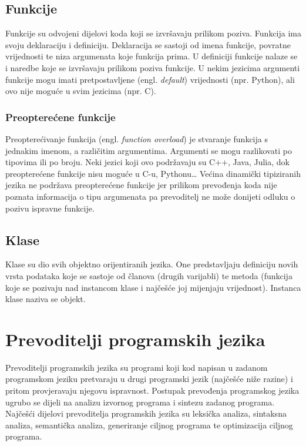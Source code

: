 \documentclass[times, utf8, zavrsni]{fer}
\begin{document}
\section{Funkcije}
Funkcije su odvojeni dijelovi koda koji se izvršavaju prilikom poziva. Funkcija ima svoju deklaraciju i definiciju. Deklaracija se sastoji od imena funkcije, povratne vrijednosti 
te niza argumenata koje funkcija prima. U definiciji funkcije nalaze se i naredbe koje se izvršavaju prilikom poziva funkcije. U nekim jezicima argumenti funkcije mogu imati 
pretpostavljene (engl. \textit{default}) vrijednosti (npr. Python), ali ovo nije moguće u svim jezicima (npr. C).

\subsection{Preopterećene funkcije}
Preopterećivanje funkcija (engl. \textit{function overload}) je stvaranje funkcija s jednakim imenom, a različitim argumentima. Argumenti se mogu razlikovati po tipovima
ili po broju. Neki jezici koji ovo podržavaju su C++, Java, Julia, dok preopterećene funkcije nisu moguće u C-u, Pythonu\dots \citep{Kahanwal2014ComparativeSO} Većina dinamički tipiziranih jezika ne podržava
preopterećene funkcije jer prilikom prevođenja koda nije poznata informacija o tipu argumenata pa prevoditelj ne može donijeti odluku o pozivu ispravne funkcije.

\section{Klase}
Klase su dio svih objektno orijentiranih jezika. One predstavljaju definiciju novih vrsta podataka koje se sastoje od članova (drugih varijabli) te metoda (funkcija koje se pozivaju
nad instancom klase i najčešće joj mijenjaju vrijednost). Instanca klase naziva se objekt.

\chapter{Prevoditelji programskih jezika}
Prevoditelji programskih jezika su programi koji kod napisan u zadanom programskom jeziku pretvaraju u drugi programski jezik (najčešće niže razine) i pritom provjeravaju njegovu ispravnost.
Postupak prevođenja programskog jezika ugrubo se dijeli na analizu izvornog programa i sintezu zadanog programa. Najčešći dijelovi prevoditelja programskih jezika su leksička analiza,
sintaksna analiza, semantička analiza, generiranje ciljnog programa te optimizacija ciljnog programa.
\end{document}
